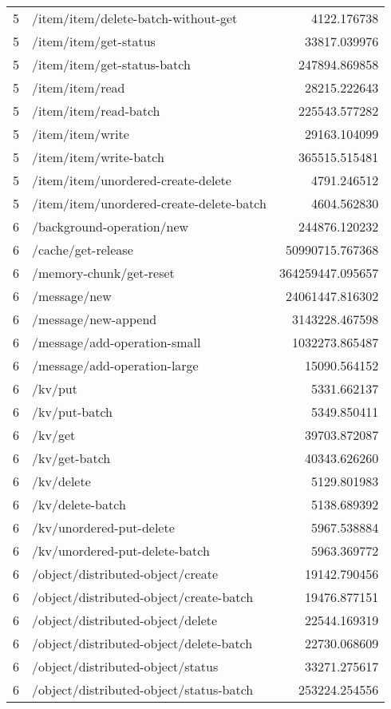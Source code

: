 \begin{longtable}{rlr}
5 & /item/item/delete-batch-without-get & 4122.176738 \\
5 & /item/item/get-status & 33817.039976 \\
5 & /item/item/get-status-batch & 247894.869858 \\
5 & /item/item/read & 28215.222643 \\
5 & /item/item/read-batch & 225543.577282 \\
5 & /item/item/write & 29163.104099 \\
5 & /item/item/write-batch & 365515.515481 \\
5 & /item/item/unordered-create-delete & 4791.246512 \\
5 & /item/item/unordered-create-delete-batch & 4604.562830 \\
6 & /background-operation/new & 244876.120232 \\
6 & /cache/get-release & 50990715.767368 \\
6 & /memory-chunk/get-reset & 364259447.095657 \\
6 & /message/new & 24061447.816302 \\
6 & /message/new-append & 3143228.467598 \\
6 & /message/add-operation-small & 1032273.865487 \\
6 & /message/add-operation-large & 15090.564152 \\
6 & /kv/put & 5331.662137 \\
6 & /kv/put-batch & 5349.850411 \\
6 & /kv/get & 39703.872087 \\
6 & /kv/get-batch & 40343.626260 \\
6 & /kv/delete & 5129.801983 \\
6 & /kv/delete-batch & 5138.689392 \\
6 & /kv/unordered-put-delete & 5967.538884 \\
6 & /kv/unordered-put-delete-batch & 5963.369772 \\
6 & /object/distributed-object/create & 19142.790456 \\
6 & /object/distributed-object/create-batch & 19476.877151 \\
6 & /object/distributed-object/delete & 22544.169319 \\
6 & /object/distributed-object/delete-batch & 22730.068609 \\
6 & /object/distributed-object/status & 33271.275617 \\
6 & /object/distributed-object/status-batch & 253224.254556 \\

\end{longtable}
